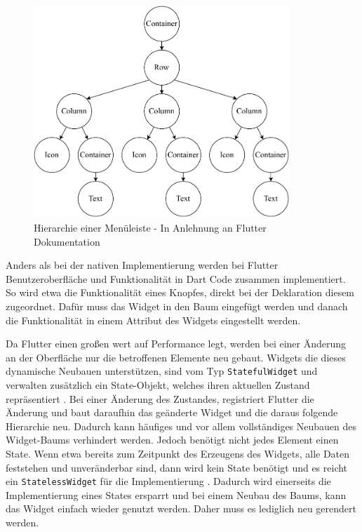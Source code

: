 \begin{figure}[ht]
  \centering
  \includegraphics[height=8cm,keepaspectratio]{images/Flutter_menu_replacement.drawio.pdf} 
  \caption[Hierarchie einer Menüleiste]{Hierarchie einer Menüleiste - In Anlehnung an Flutter Dokumentation\protect\footnotemark}
  \label{fig:flutter_layout_tree}
\end{figure}


Anders als bei der nativen Implementierung werden bei Flutter Benutzeroberfläche und Funktionalität in Dart Code zusammen implementiert. So wird etwa die Funktionalität eines Knopfes, direkt bei der Deklaration diesem zugeordnet. Dafür muss das Widget in den Baum eingefügt werden und danach die Funktionalität in einem Attribut des Widgets eingestellt werden.

Da Flutter einen großen wert auf Performance legt, werden bei einer Änderung an der Oberfläche nur die betroffenen Elemente neu gebaut. Widgets die dieses dynamische Neubauen unterstützen, sind vom Typ \verb|StatefulWidget| und verwalten zusätzlich ein State-Objekt, welches ihren aktuellen Zustand repräsentiert \cite[Kapitel~4]{Flutter_Recipes}. Bei einer Änderung des Zustandes, registriert Flutter die Änderung und baut daraufhin das geänderte Widget und die daraus folgende Hierarchie neu\cite{9623025}. Dadurch kann häufiges und vor allem vollständiges Neubauen des Widget-Baums verhindert werden. Jedoch benötigt nicht jedes Element einen State. Wenn etwa bereits zum Zeitpunkt des Erzeugens des Widgets, alle Daten feststehen und unveränderbar sind, dann wird kein State benötigt und es reicht ein \verb|StatelessWidget| für die Implementierung \cite[Kapitel~4]{Flutter_Recipes}. Dadurch wird einerseits die Implementierung eines States ersparrt und bei einem Neubau des Baums, kann das Widget einfach wieder genutzt werden. Daher muss es lediglich neu gerendert werden.

